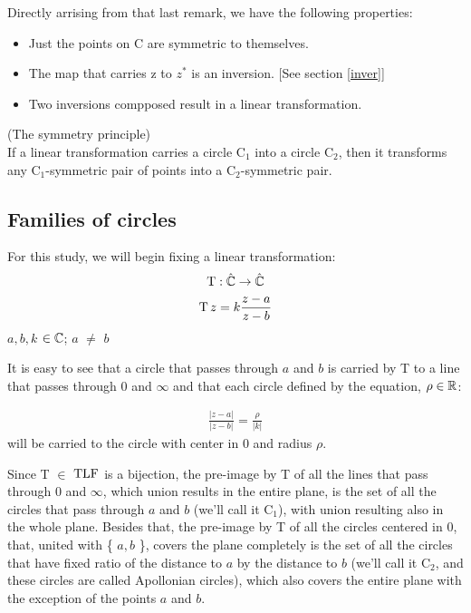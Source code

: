 \BlankLine

Directly arrising from that last remark, we have the following properties:
\begin{itemize}
    \item Just the points on C are symmetric to themselves.
    \item The map that carries z to $z^{*}$ is an inversion. [See section \ref{inver}]
    \item Two inversions compposed result in a linear transformation.
\end{itemize}

\begin{teorema} (The symmetry principle)\\
If a linear transformation carries a circle C$_1$ into a circle C$_2$, then it transforms any C$_1$-symmetric pair of points into a C$_2$-symmetric pair.
\end{teorema}

\subsection{Families of circles}
For this study, we will begin fixing a linear transformation:
\begin{gather*}
    \operatorname{T}:\hat{\mathbb{C}} \rightarrow \hat{\mathbb{C}}\\
    \operatorname{T}z = k \frac{z - a}{z - b}
\end{gather*}
$a, b, k$ $\in \mathbb{C}$; $a$ $\neq$ $b$

It is easy to see that a circle that passes through $a$ and $b$ is carried by T to a line that passes through 0 and $\infty$ and that each circle defined by the equation, $\rho \in \mathbb{R}$:

\begin{gather*}
    \frac{|z-a|}{|z-b|} = \frac{\rho}{|k|}
\end{gather*}
will be carried to the circle with center in 0 and radius $\rho$.

Since T $\in$ $\operatorname{TLF}$ is a bijection, the pre-image by T of all the lines that pass through 0 and $\infty$, which union results in the entire plane, is the set of all the circles that pass through $a$ and $b$ (we'll call it C$_1$), with union resulting also in the whole plane. Besides that, the pre-image by T of all the circles centered in 0, that, united with \{ $a, b$ \}, covers the plane completely is the set of all the circles that have fixed ratio of the distance to $a$ by the distance to $b$ (we'll call it C$_2$, and these circles are called Apollonian circles), which also covers the entire plane with the exception of the points $a$ and $b$.

